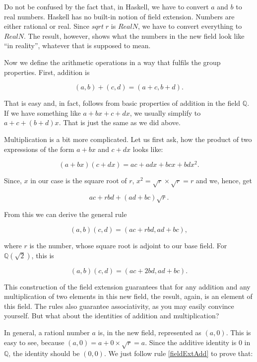 \documentclass[tikz]{scrreprt}
\newcommand{\Conid}[1]{\mathit{#1}}
\newcommand{\Varid}[1]{\mathit{#1}}
\begin{document}
Do not be confused by the fact
that, in Haskell, we have to convert $a$ and $b$ to real numbers.
Haskell has no built-in notion of field extension.
Numbers are either rational or real. Since \ensuremath{\Varid{sqrt}\;\Varid{r}} is \ensuremath{\Conid{RealN}},
we have to convert
everything to \ensuremath{\Conid{RealN}}. The result, however, shows
what the numbers in the new field look like ``in reality'',
whatever that is supposed to mean.

Now we define the arithmetic operations in a way that fulfils 
the group properties. First, addition is

\begin{equation}\label{fieldExtAdd}
(a,b) + (c,d) = (a+c,b+d).
\end{equation}

That is easy and, in fact, follows from basic properties
of addition in the field $\mathbb{Q}$.
If we have something like $a+bx+c+dx$, we usually simplify to
$a+c+(b+d)x$. That is just the same as we did above.

Multiplication is a bit more complicated.
Let us first ask, how the product of two expressions
of the form $a+bx$ and $c+dx$ looks like:

\[
(a+bx)(c+dx)=ac+adx+bcx+bdx^2.
\]

Since, $x$ in our case is the square root of $r$, 
$x^2=\sqrt{r}\times\sqrt{r}=r$ 
and we, hence, get

\[
ac+rbd+(ad+bc)\sqrt{r}.
\]

From this we can derive the general rule

\begin{equation}\label{fieldExtMul}
(a,b)(c,d) = (ac+rbd,ad+bc),
\end{equation}

where $r$ is the number, whose square root is adjoint to our base field.
For $\mathbb{Q}(\sqrt{2})$, this is 

\begin{equation}
(a,b)(c,d) = (ac+2bd,ad+bc).
\end{equation}

This construction of the field extension guarantees
that for any addition and any multiplication 
of two elements in this new field, the result, again,
is an element of this field.
The rules also guarantee associativity,
as you may easily convince yourself.
But what about the identities of addition and multiplication?

In general, a rationl number $a$ is, in the new field,
represented as $(a,0)$.
This is easy to see, 
because $(a,0) = a+0\times\sqrt{r} = a$.
Since the additive identity is 0
in $\mathbb{Q}$, the identity should be $(0,0)$.
We just follow rule \ref{fieldExtAdd}
to prove that:
\end{document}
